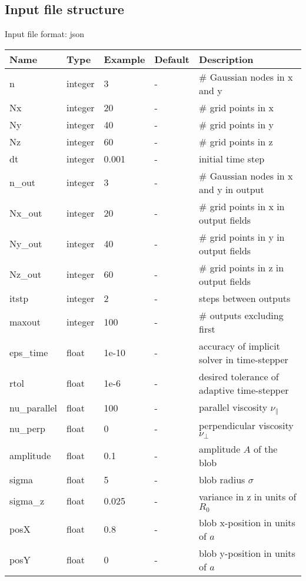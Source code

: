 \subsection{Input file structure}
Input file format: json

\begin{longtable}{llll>{\RaggedRight}p{7cm}}
\toprule
\rowcolor{gray!50}\textbf{Name} &  \textbf{Type} & \textbf{Example} & \textbf{Default} & \textbf{Description}  \\ \midrule
  n      & integer & 3 & - &\# Gaussian nodes in x and y \\
  Nx     & integer &20& - &\# grid points in x \\
  Ny     & integer &40& - &\# grid points in y \\
  Nz     & integer &60& - &\# grid points in z \\
  dt     & integer &0.001& - &initial time step\\
  n\_out  & integer &3  & - &\# Gaussian nodes in x and y in output \\
  Nx\_out & integer &20& - &\# grid points in x in output fields \\
  Ny\_out & integer &40& - &\# grid points in y in output fields \\
  Nz\_out & integer &60& - &\# grid points in z in output fields \\
  itstp  & integer &2  & - &   steps between outputs \\
  maxout & integer &100& - &      \# outputs excluding first \\
  eps\_time  & float &1e-10   & - & accuracy of implicit solver in time-stepper \\
  rtol  & float  & 1e-6  & - & desired tolerance of adaptive time-stepper \\
  nu\_parallel    & float &100   & - & parallel viscosity $\nu_\parallel$ \\
  nu\_perp    & float &0   & - & perpendicular viscosity $\nu_\perp$ \\
  amplitude  & float &0.1    & - & amplitude $A$ of the blob \\
  sigma      & float &5     & - & blob radius $\sigma$ \\
  sigma\_z   & float &0.025  & - & variance in z in units of $R_0$ \\
  posX       & float &0.8    & - & blob x-position in units of $a$\\
  posY       & float &0    & - & blob y-position in units of $a$\\

\end{longtable}
